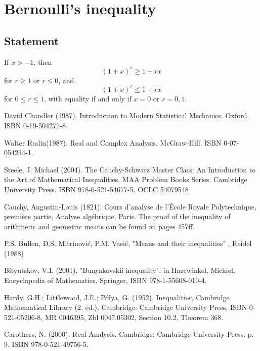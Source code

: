 \documentclass[a4paper]{report}
\begin{document}
\chapter{Bernoulli's inequality}
\section{Statement}
\begin{thr}
If $x> -1$, then
   \begin{equation}
   (1+x)^r\geqslant 1+rx
   \end{equation}
for $r\geqslant 1$ or $r\leqslant 0$, and
   \begin{equation}
   (1+x)^r\leqslant 1+rx
   \end{equation}
for $0\leqslant r\leqslant 1$, with equality if and only if $x=0$ or $r=0,1$.
\end{thr}

\newpage
\begin{thebibliography}{}

David Chandler (1987). Introduction to Modern Statistical Mechanics. Oxford. ISBN 0-19-504277-8.

Walter Rudin(1987). Real and Complex Analysis. McGraw-Hill. ISBN 0-07-054234-1.

Steele, J. Michael (2004). The Cauchy-Schwarz Master Class: An Introduction to the Art of Mathematical Inequalities. MAA Problem Books Series. Cambridge University Press. ISBN 978-0-521-54677-5. OCLC 54079548

Cauchy, Augustin-Louis (1821). Cours d'analyse de l'École Royale Polytechnique, première partie, Analyse algébrique, Paris. The proof of the inequality of arithmetic and geometric means can be found on pages 457ff.

P.S. Bullen, D.S. Mitrinović, P.M. Vasić, "Means and their inequalities" , Reidel (1988)


Bityutskov, V.I. (2001), "Bunyakovskii inequality", in Hazewinkel, Michiel, Encyclopedia of Mathematics, Springer, ISBN 978-1-55608-010-4.

Hardy, G.H.; Littlewood, J.E.; Pólya, G. (1952), Inequalities, Cambridge Mathematical Library (2. ed.), Cambridge: Cambridge University Press, ISBN 0-521-05206-8, MR 0046395, Zbl 0047.05302, Section 10.2, Theorem 368.

Carothers, N. (2000). Real Analysis. Cambridge: Cambridge University Press. p. 9. ISBN 978-0-521-49756-5.


\end{thebibliography}

 
\end{document}

